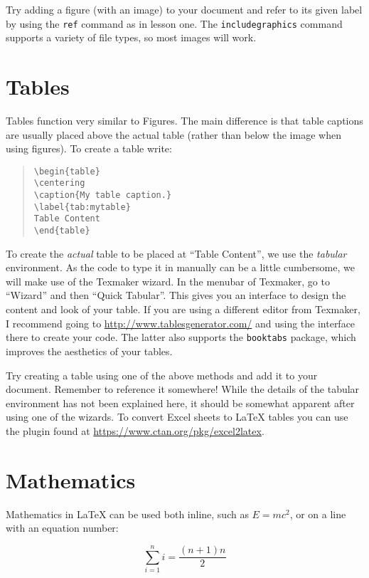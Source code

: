 \documentclass[a4paper,oneside]{memoir}
\begin{document}
Try adding a figure (with an image) to your document and refer to its given label by using the \texttt{ref} command as in lesson one. The \texttt{includegraphics} command supports a variety of file types, so most images will work.

\section{Tables}
Tables function very similar to Figures. The main difference is that table captions are usually placed above the actual table (rather than below the image when using figures). To create a table write:

\begin{quote}
\begin{lstlisting}
\begin{table}
\centering
\caption{My table caption.}
\label{tab:mytable}
Table Content
\end{table}
\end{lstlisting}
\end{quote}

To create the \emph{actual} table to be placed at \enquote{Table Content}, we use the \emph{tabular} environment. As the code to type it in manually can be a little cumbersome, we will make use of the Texmaker wizard. In the menubar of Texmaker, go to \enquote{Wizard} and then \enquote{Quick Tabular}. This gives you an interface to design the content and look of your table. If you are using a different editor from Texmaker, I recommend going to \url{http://www.tablesgenerator.com/} and using the interface there to create your code. The latter also supports the \texttt{booktabs} package, which improves the aesthetics of your tables.

Try creating a table using one of the above methods and add it to your document. Remember to reference it somewhere! While the details of the tabular environment has not been explained here, it should be somewhat apparent after using one of the wizards. To convert Excel sheets to \LaTeX{} tables you can use the plugin found at \url{https://www.ctan.org/pkg/excel2latex}.

\section{Mathematics}
Mathematics in \LaTeX{} can be used both inline, such as $E = mc^2$, or on a line with an equation number:

\begin{equation}
\sum_{i=1}^{n} i = \frac{(n+1)n}{2}
\end{equation}
\end{document}
